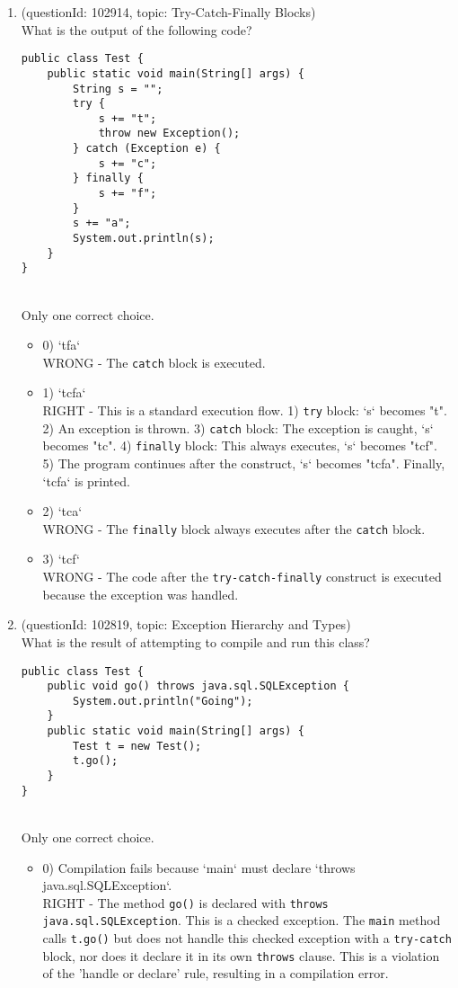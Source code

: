 \documentclass[12pt]{article}
\begin{document}
\begin{enumerate}[label=(\arabic*)]
\begin{itemize}
\end{itemize}
\item (questionId: 102914, topic: Try-Catch-Finally Blocks) \\ 
What is the output of the following code?
\begin{verbatim}
public class Test {
    public static void main(String[] args) {
        String s = "";
        try {
            s += "t";
            throw new Exception();
        } catch (Exception e) {
            s += "c";
        } finally {
            s += "f";
        }
        s += "a";
        System.out.println(s);
    }
}
\end{verbatim}
\\ \noindent Only one correct choice. 
\begin{itemize}
\item 0) `tfa`
 \\ 
WRONG - The \verb|catch| block is executed.

\item 1) `tcfa`
 \\ 
RIGHT - This is a standard execution flow. 1) \verb|try| block: `s` becomes "t". 2) An exception is thrown. 3) \verb|catch| block: The exception is caught, `s` becomes "tc". 4) \verb|finally| block: This always executes, `s` becomes "tcf". 5) The program continues after the construct, `s` becomes "tcfa". Finally, `tcfa` is printed.

\item 2) `tca`
 \\ 
WRONG - The \verb|finally| block always executes after the \verb|catch| block.

\item 3) `tcf`
 \\ 
WRONG - The code after the \verb|try-catch-finally| construct is executed because the exception was handled.

\end{itemize}
\item (questionId: 102819, topic: Exception Hierarchy and Types) \\ 
What is the result of attempting to compile and run this class?
\begin{verbatim}
public class Test {
    public void go() throws java.sql.SQLException {
        System.out.println("Going");
    }
    public static void main(String[] args) {
        Test t = new Test();
        t.go();
    }
}
\end{verbatim}
\\ \noindent Only one correct choice. 
\begin{itemize}
\item 0) Compilation fails because `main` must declare `throws java.sql.SQLException`.
 \\ 
RIGHT - The method \verb|go()| is declared with \verb|throws java.sql.SQLException|. This is a checked exception. The \verb|main| method calls \verb|t.go()| but does not handle this checked exception with a \verb|try-catch| block, nor does it declare it in its own \verb|throws| clause. This is a violation of the 'handle or declare' rule, resulting in a compilation error.


\end{itemize}
\end{enumerate}
\end{document}
